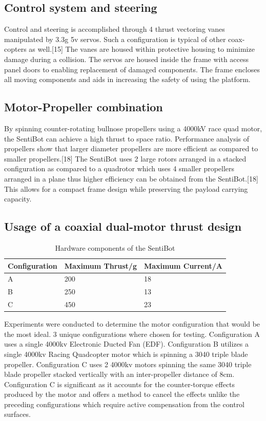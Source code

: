 \documentclass[12pt]{article}
\begin{document}
\subsection{Control system and steering}

Control and steering is accomplished through 4 thrust vectoring vanes manipulated by 3.3g 5v servos. Such a configuration is typical of other coax-copters as well.[15] The vanes are housed within protective housing to minimize damage during a collision. The servos are housed inside the frame with access panel doors to enabling replacement of damaged components. The frame encloses all moving components and aids in increasing the safety of using the platform.

\subsection{Motor-Propeller combination}

By spinning counter-rotating bullnose propellers using a 4000kV race quad motor, the SentiBot can achieve a high thrust to space ratio. Performance analysis of propellers show that larger diameter propellers are more efficient as compared to smaller propellers.[18] The SentiBot uses 2 large rotors arranged in a stacked configuration as compared to a quadrotor which uses 4 smaller propellers arranged in a plane thus higher efficiency can be obtained from the SentiBot.[18] This allows for a compact frame design while preserving the payload carrying capacity.

\subsection{Usage of a coaxial dual-motor thrust design}

\begin{table}[b]
	\centering
	\begin{tabular}{ | l | l | l | }
		Configuration & Maximum Thrust/g & Maximum Current/A \\
		\hline
		A & 200 & 18 \\
		B & 250 & 13 \\
		C & 450 & 23 \\
	\end{tabular}
	\caption{Hardware components of the SentiBot}
	\label{fig:sb-configs}
\end{table}

Experiments were conducted to determine the motor configuration that would be the most ideal. 3 unique configurations where chosen for testing. Configuration A uses a single 4000kv Electronic Ducted Fan (EDF).  Configuration B utilizes a single 4000kv Racing Quadcopter motor which is spinning a 3040 triple blade propeller. Configuration C uses 2 4000kv motors spinning the same 3040 triple blade propeller stacked vertically with an inter-propeller distance of 8cm. Configuration C is significant as it accounts for the counter-torque effects produced by the motor and offers a method to cancel the effects unlike the preceding configurations which require active compensation from the control surfaces.
\end{document}

